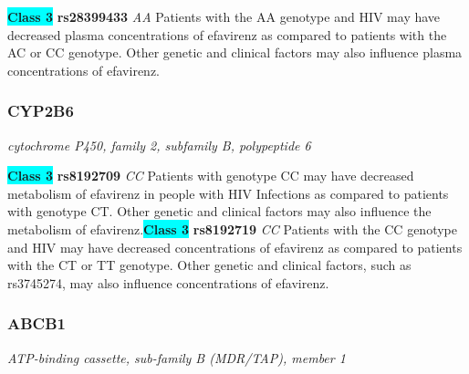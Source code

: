 \documentclass{report}
\begin{document}
\textbf{\colorbox{cyan} {Class 3}} \textbf{ rs28399433 } \textit{ AA }
Patients with the AA genotype and HIV may have decreased plasma concentrations of efavirenz as compared to patients with the AC or CC genotype. Other genetic and clinical factors may also influence plasma concentrations of efavirenz.\newline\subsubsection{ CYP2B6 }
\textit{ cytochrome P450, family 2, subfamily B, polypeptide 6 }

\textbf{\colorbox{cyan} {Class 3}} \textbf{ rs8192709 } \textit{ CC }
Patients with genotype CC may have decreased metabolism of efavirenz in people with HIV Infections as compared to patients with genotype CT. Other genetic and clinical factors may also influence the metabolism of efavirenz.\newline\textbf{\colorbox{cyan} {Class 3}} \textbf{ rs8192719 } \textit{ CC }
Patients with the CC genotype and HIV may have decreased concentrations of efavirenz as compared to patients with the CT or TT genotype. Other genetic and clinical factors, such as rs3745274, may also influence concentrations of efavirenz. \newline\subsubsection{ ABCB1 }
\textit{ ATP-binding cassette, sub-family B (MDR/TAP), member 1 }
\end{document}
